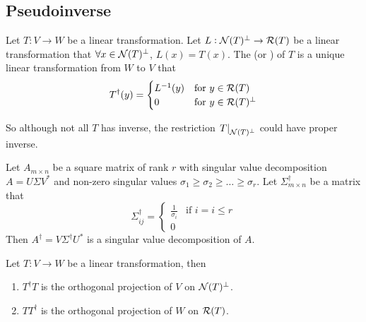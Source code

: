\subsection{Pseudoinverse}

\begin{definition}
    Let $T: V \rightarrow W$ be a linear transformation. Let $L: \mathcal{N}(T)^\bot \rightarrow \mathcal{R}(T)$ be a linear transformation that $\forall x \in \mathcal{N}(T)^\bot$, $L(x) = T(x)$. The  (or ) of $T$ is a unique linear transformation from $W$ to $V$ that
    \begin{equation}
        T^\dag (y) = \begin{cases}
            L^{-1}(y) & \text{for } y \in \mathcal{R}(T) \\
            0 & \text{for } y \in \mathcal{R}(T)^\bot
        \end{cases}
    \end{equation}
    
    So although not all $T$ has inverse, the restriction $\left. T \right|_{\mathcal{N}(T)^\bot}$ could have proper inverse.
\end{definition}

\begin{theorem}
    Let $A_{m \times n}$ be a square matrix of rank $r$ with singular value decomposition $A = U \Sigma V^*$ and non-zero singular values $\sigma_1 \geq \sigma_2 \geq \dots \geq \sigma_r$. Let $\Sigma^\dag_{m \times n}$  be a matrix that 
    \begin{equation}
        \Sigma^\dag_{ij} = \begin{cases}
            \frac{1}{\sigma_i} & \text{if } i = i \leq r \\
            0 
        \end{cases}
    \end{equation}
    Then $A^\dag = V \Sigma^\dag U^*$ is a singular value decomposition of $A$.
\end{theorem}


\begin{theorem}
    Let $T: V \rightarrow W$ be a linear transformation, then
    \begin{enumerate}
        \item $T^\dag T$ is the orthogonal projection of $V$ on $\mathcal{N}(T)^\bot$.
        \item $TT^\dag$ is the orthogonal projection of $W$ on $\mathcal{R}(T)$.
    \end{enumerate}    
\end{theorem}


